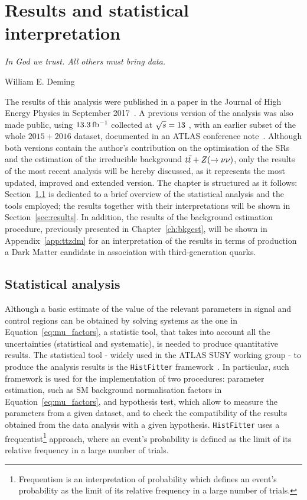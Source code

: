 \chapter{Results and statistical interpretation}
\label{ch:results}
\epigraph{\emph{In God we trust. All others must bring data.}}{William E. Deming}

	The results of this analysis were published in a paper in the Journal of High Energy Physics in September 2017~\cite{stop0L}. A previous version of the analysis was also made public, using $13.3\,\mbox{fb$^{-1}$}$ collected at $\sqrt{s} = 13$ \TeV, with an earlier subset of the whole $2015+2016$ dataset, documented in an ATLAS conference note~\cite{ICHEPstop0L}. Although both versions contain the author's contribution on the optimisation of the \acp{SR} and the estimation of the irreducible background $t\bar{t}+Z (\rightarrow \nu\nu)$, only the results of the most recent analysis will be hereby discussed, as it represents the most updated, improved and extended version. The chapter is structured as it follows: Section~\ref{sec:stat_ana} is dedicated to a brief overview of the statistical analysis and the tools employed; the results together with their interpretations will be shown in Section~\ref{sec:results}. In addition, the results of the background estimation procedure, previously presented in Chapter~\ref{ch:bkgest}, will be shown in Appendix~\ref{app:ttzdm} for an interpretation of the results in terms of production a Dark Matter candidate in association with third-generation quarks.


	\section{Statistical analysis}
	\label{sec:stat_ana}

		Although a basic estimate of the value of the relevant parameters in signal and control regions can be obtained by solving systems as the one in Equation~\ref{eq:mu_factors}, a statistic tool, that takes into account all the uncertainties (statistical and systematic), is needed to produce quantitative results. The statistical tool - widely used in the ATLAS SUSY working group - to produce the analysis results is the \texttt{HistFitter} framework~\cite{histfitter}. In particular, such framework is used for the implementation of two procedures: parameter estimation, such as \ac{SM} background normalisation factors in Equation~\ref{eq:mu_factors}, and hypothesis test, which allow to measure the parameters from a given dataset, and to check the compatibility of the results obtained from the data analysis with a given hypothesis. \texttt{HistFitter} uses a frequentist\footnote{Frequentism is an interpretation of probability which defines an event's probability as the limit of its relative frequency in a large number of trials.} approach, where an event's probability is defined as the limit of its relative frequency in a large number of trials.

